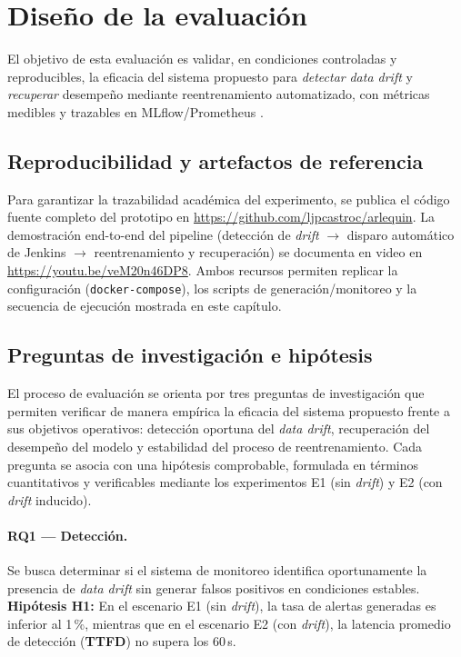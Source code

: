 \section{Diseño de la evaluación}
\label{sec:eval-design}

El objetivo de esta evaluación es validar, en condiciones controladas y reproducibles, la eficacia del sistema propuesto para \textit{detectar} \textit{data drift} y \textit{recuperar} desempeño mediante reentrenamiento automatizado, con métricas medibles y trazables en MLflow/Prometheus \citep{Gama2014,Breck2019,Chawla2021}.

\subsection{Reproducibilidad y artefactos de referencia}
\label{subsec:eval-repo-video}

Para garantizar la trazabilidad académica del experimento, se publica el código fuente completo del prototipo en \href{https://github.com/ljpcastroc/arlequin}{https://github.com/ljpcastroc/arlequin}. La demostración end-to-end del pipeline (detección de \textit{drift} $\rightarrow$ disparo automático de Jenkins $\rightarrow$ reentrenamiento y recuperación) se documenta en video en \href{https://youtu.be/veM20n46DP8}{https://youtu.be/veM20n46DP8}. Ambos recursos permiten replicar la configuración (\texttt{docker-compose}), los scripts de generación/monitoreo y la secuencia de ejecución mostrada en este capítulo.


\subsection{Preguntas de investigación e hipótesis}
\label{subsec:eval-rq}

El proceso de evaluación se orienta por tres preguntas de investigación que permiten verificar de manera empírica la eficacia del sistema propuesto frente a sus objetivos operativos: detección oportuna del \textit{data drift}, recuperación del desempeño del modelo y estabilidad del proceso de reentrenamiento. Cada pregunta se asocia con una hipótesis comprobable, formulada en términos cuantitativos y verificables mediante los experimentos E1 (sin \textit{drift}) y E2 (con \textit{drift} inducido).

\paragraph{RQ1 — Detección.}
Se busca determinar si el sistema de monitoreo identifica oportunamente la presencia de \textit{data drift} sin generar falsos positivos en condiciones estables.  
\textbf{Hipótesis H1:} En el escenario E1 (sin \textit{drift}), la tasa de alertas generadas es inferior al 1\,\%, mientras que en el escenario E2 (con \textit{drift}), la latencia promedio de detección (\textbf{TTFD}) no supera los 60\,s.

